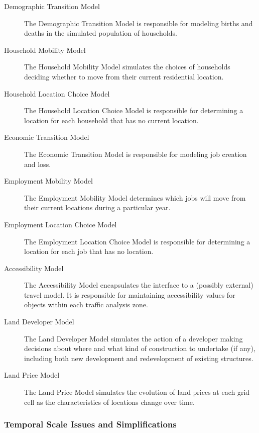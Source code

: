 \begin{description}

\item[Demographic Transition Model]
The Demographic Transition Model is responsible for modeling
births and deaths in the simulated population of households.

\item[Household Mobility Model]
The Household Mobility Model simulates the choices of households
deciding whether to move from their current residential location.

\item[Household Location Choice Model]
The Household Location Choice Model is responsible for determining
a location for each household that has no current location.

\item[Economic Transition Model]
The Economic Transition Model is responsible for modeling job
creation and loss.

\item[Employment Mobility Model]
The Employment Mobility Model determines which jobs will move from
their current locations during a particular year.

\item[Employment Location Choice Model]
The Employment Location Choice Model is responsible for
determining a location for each job that has no location.

\item[Accessibility Model]
The Accessibility Model encapsulates the interface to a (possibly
external) travel model.  It is responsible for maintaining
accessibility values for objects within each traffic analysis
zone.

\item[Land Developer Model]
The Land Developer Model simulates the action of a developer
making decisions about where and what kind of construction to
undertake (if any), including both new development and
redevelopment of existing structures.

\item[Land Price Model]
The Land Price Model simulates the evolution of land prices at
each grid cell as the characteristics of locations change over
time.

\end{description}

\subsubsection{Temporal Scale Issues and Simplifications}


